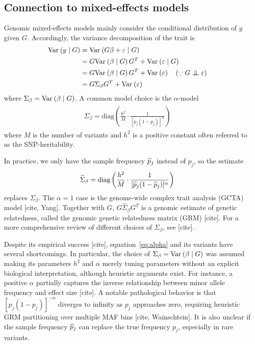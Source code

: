 \documentclass[10pt]{article}
\begin{document}
\subsection{Connection to mixed-effects models}

Genomic mixed-effects models mainly consider the conditional distribution of $y$ given $G$.
Accordingly, the variance decomposition of the trait is
\begin{align}
    \begin{aligned}
    \var{y \mid G} &= \var{G\beta + \veps \mid G} \\
    &= G\var{\beta \mid G}G^T + \var{\veps \mid G} \\
    &= G\var{\beta \mid G}G^T + \var{\veps} 
    \quad
    (\because G \indep \veps) \\
    &= G \Sigma_\beta G^T + \var{\veps}
    \end{aligned}
\end{align}
where $\Sigma_\beta = \mathrm{Var}_{}\left(\beta \mid G\right)$.
A common model choice is the $\alpha$-model
\begin{align}
    \begin{aligned}
        \Sigma_\beta = \textrm{diag}
        \left( 
        \frac{h^2}{M } \cdot \frac{1}{[p_j(1-p_j)]^\alpha}
        \right) 
    \end{aligned} 
\end{align}
where $M$ is the number of variants and $h^2$ is a positive constant often referred to as the SNP-heritability.

In practice, we only have the sample frequency $\widehat{p}_j$ instead of $p_j$, so the estimate
\begin{align} \label{eq:alpha}
    \begin{aligned}
        \widehat{\Sigma}_{\beta} = \textrm{diag}
        \left( 
        \frac{h^2}{M } \cdot \frac{1}{[\widehat{p}_j(1-\widehat{p}_j)]^\alpha}
        \right) 
    \end{aligned}
\end{align}
replaces $\Sigma_\beta$.
The $\alpha=1$ case is the genome-wide complex trait analysis (GCTA) model [cite, Yang].
Together with $G$, $G \widehat{\Sigma}_{\beta}G^T$ is a genomic estimate of genetic relatedness, called the genomic genetic relatedness matrix (GRM) [cite].
For a more comprehensive review of different choices of $\Sigma_\beta$, see [cite].

Despite its empirical success [cite], 
equation~\ref{eq:alpha} and its variants have several shortcomings.
In particular, the choice of $\Sigma_\beta = \mathrm{Var}_{}\left(\beta \mid G\right)$ was assumed making its parameters $h^2$ and $\alpha$ merely tuning parameters without an explicit biological interpretation, although heuristic arguments exist.
For instance, a positive $\alpha$ partially captures the inverse relationship between minor allele frequency and effect size [cite].
A notable pathological behavior is that $[p_j(1-p_j)]^{-\alpha}$ diverges to infinity as $p_j$ approaches zero, requiring heuristic GRM partitioning over multiple MAF bins [cite, Wainschtein].
It is also unclear if the sample frequency $\widehat{p}_j$ can replace the true frequency $p_j$, especially in rare variants.
\end{document}

